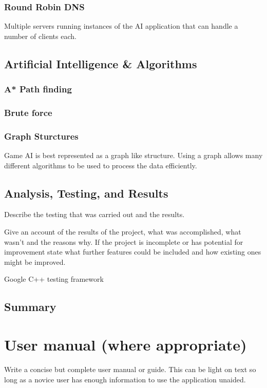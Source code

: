 \documentclass[12pt,a4paper,titlepage]{article}
\begin{document}
\subsubsection{Round Robin DNS}

Multiple servers running instances of the AI application that can handle a number of clients each. 

\subsection{Artificial Intelligence \& Algorithms}
\label{section:aimoduledesign}

\subsubsection{A* Path finding}

\subsubsection{Brute force}

\subsubsection{Graph Sturctures}

Game AI is best represented as a graph like structure. Using a graph allows many different algorithms to be used to process the data efficiently.

\subsection{Analysis, Testing, and Results}

Describe the testing that was carried out and the results.

Give an account of the results of the project, what was accomplished, what wasn't and the reasons why. If the project is incomplete or has potential for improvement state what further features could be included and how existing ones might be improved.

Google C++ testing framework

\subsection{Summary}


\section{User manual (where appropriate)}
Write a concise but complete user manual or guide. This can be light on text so long as a novice user has enough information to use the application unaided.
\end{document}
